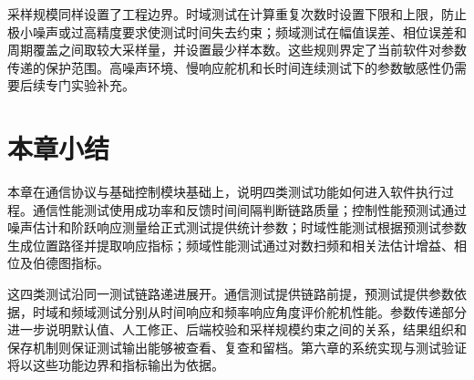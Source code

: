 采样规模同样设置了工程边界。时域测试在计算重复次数时设置下限和上限，防止极小噪声或过高精度要求使测试时间失去约束；频域测试在幅值误差、相位误差和周期覆盖之间取较大采样量，并设置最少样本数。这些规则界定了当前软件对参数传递的保护范围。高噪声环境、慢响应舵机和长时间连续测试下的参数敏感性仍需要后续专门实验补充。

\section{本章小结}

本章在通信协议与基础控制模块基础上，说明四类测试功能如何进入软件执行过程。通信性能测试使用成功率和反馈时间间隔判断链路质量；控制性能预测试通过噪声估计和阶跃响应测量给正式测试提供统计参数；时域性能测试根据预测试参数生成位置路径并提取响应指标；频域性能测试通过对数扫频和相关法估计增益、相位及伯德图指标。

这四类测试沿同一测试链路递进展开。通信测试提供链路前提，预测试提供参数依据，时域和频域测试分别从时间响应和频率响应角度评价舵机性能。参数传递部分进一步说明默认值、人工修正、后端校验和采样规模约束之间的关系，结果组织和保存机制则保证测试输出能够被查看、复查和留档。第六章的系统实现与测试验证将以这些功能边界和指标输出为依据。
